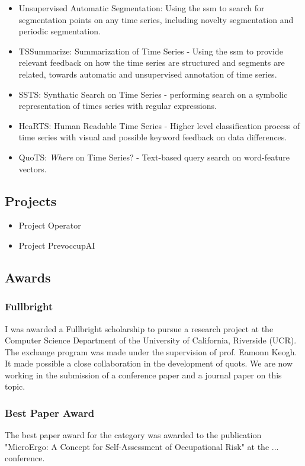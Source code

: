 \begin{itemize}

\item Unsupervised Automatic Segmentation: Using the \gls{ssm} to search for segmentation points on any time series, including novelty segmentation and periodic segmentation.

\item TSSummarize: Summarization of Time Series - Using the \gls{ssm} to provide relevant feedback on how the time series are structured and segments are related, towards automatic and unsupervised annotation of time series.

\item SSTS: Synthatic Search on Time Series - performing search on a symbolic representation of times series with regular expressions.

\item HeaRTS: Human Readable Time Series - Higher level classification process of time series with visual and possible keyword feedback on data differences.

\item QuoTS: \textit{Where} on Time Series? - Text-based query search on word-feature vectors. 

\end{itemize}

\subsection{Projects}

\begin{itemize}
\item Project Operator
\item Project PrevoccupAI
\end{itemize}

\subsection{Awards}

\subsubsection{Fullbright}

I was awarded a Fullbright scholarship to pursue a research project at the Computer Science Department of the University of California, Riverside (UCR). The exchange program was made under the supervision of prof. Eamonn Keogh. It made possible a close collaboration in the development of \gls{quots}. We are now working in the submission of a conference paper and a journal paper on this topic.

\subsubsection{Best Paper Award}

The best paper award for the category was awarded to the publication "MicroErgo: A Concept for Self-Assessment of Occupational Risk" at the ... conference.

